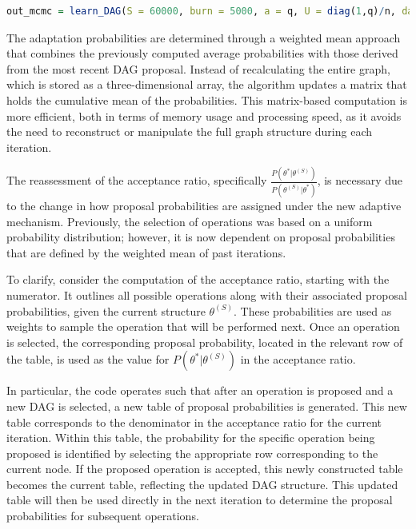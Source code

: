 \documentclass{report}
\begin{document}
\begin{lstlisting}[language=R]
	out_mcmc = learn_DAG(S = 60000, burn = 5000, a = q, U = diag(1,q)/n, data = X, w = 0.1, fast = TRUE, save.memory = T, adaptive_mcmc = TRUE, adapt_factor = 0.7)
\end{lstlisting}

The adaptation probabilities are determined through a weighted mean approach that combines the previously computed average probabilities with those derived from the most recent DAG proposal. Instead of recalculating the entire graph, which is stored as a three-dimensional array, the algorithm updates a matrix that holds the cumulative mean of the probabilities. This matrix-based computation is more efficient, both in terms of memory usage and processing speed, as it avoids the need to reconstruct or manipulate the full graph structure during each iteration. \hfill \break

The reassessment of the acceptance ratio, specifically $\frac{P(\theta^* | \theta^{(S)})}{P(\theta^{(S)} | \theta^*)}$, is necessary due to the change in how proposal probabilities are assigned under the new adaptive mechanism. Previously, the selection of operations was based on a uniform probability distribution; however, it is now dependent on proposal probabilities that are defined by the weighted mean of past iterations. 

To clarify, consider the computation of the acceptance ratio, starting with the numerator. It outlines all possible operations along with their associated proposal probabilities, given the current structure $\theta^{(S)}$. These probabilities are used as weights to sample the operation that will be performed next. Once an operation is selected, the corresponding proposal probability, located in the relevant row of the table, is used as the value for $P(\theta^* | \theta^{(S)})$ in the acceptance ratio.

In particular, the code operates such that after an operation is proposed and a new DAG is selected, a new table of proposal probabilities is generated. This new table corresponds to the denominator in the acceptance ratio for the current iteration. Within this table, the probability for the specific operation being proposed is identified by selecting the appropriate row corresponding to the current node. If the proposed operation is accepted, this newly constructed table becomes the current table, reflecting the updated DAG structure. This updated table will then be used directly in the next iteration to determine the proposal probabilities for subsequent operations.
\end{document}
